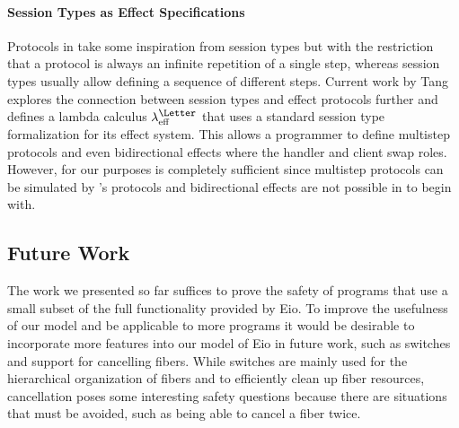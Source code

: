 \paragraph*{Session Types as Effect Specifications}
Protocols in \hazel{} take some inspiration from session types but with the restriction that a protocol is always an infinite repetition of a single step, whereas session types usually allow defining a sequence of different steps.
Current work by Tang~\cite{tangeff} explores the connection between session types and effect protocols further and defines a lambda calculus \(\lambda^{\mbox{{\footnotesize \Letter}}}_{\mathrm{eff}}\) that uses a standard session type formalization
for its effect system.
This allows a programmer to define multistep protocols and even bidirectional effects where the handler and client swap roles.
However, for our purposes \hazel{} is completely sufficient since multistep protocols can be simulated by \hazel{}'s protocols and bidirectional effects are not possible in \ocf{} to begin with.



\subsection{Future Work}
The work we presented so far suffices to prove the safety of programs that use a small subset of the full functionality provided by Eio.
To improve the usefulness of our model and be applicable to more programs it would be desirable to incorporate more features into our model of Eio in future work, such as switches and support for cancelling fibers.
While switches are mainly used for the hierarchical organization of fibers and to efficiently clean up fiber resources, cancellation poses some interesting safety questions because there are situations that must be avoided, such as being able to cancel a fiber twice.


